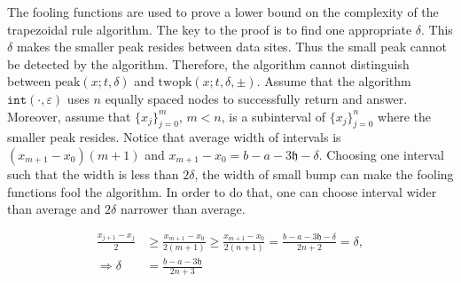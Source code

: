 \documentclass{iitthesis}
\theoremstyle{definition}
\theoremstyle{remark}
\begin{document}
The fooling functions are used to prove a lower bound on the complexity of the trapezoidal rule algorithm. The key to the proof is to find one appropriate $\delta$.  This $\delta$ makes the smaller peak resides between data sites. Thus the small peak cannot be detected by the algorithm. Therefore, the algorithm cannot distinguish between $\text{peak}(x;t,\delta)$ and $\text{twopk}(x;t,\delta,\pm)$. Assume that the algorithm $\texttt{int}(\cdot,\varepsilon)$ uses $n$ equally spaced nodes to successfully return and answer. Moreover, assume that $\{x_{j}\}_{j=0}^{m}$, $m<n$, is a subinterval of $\{x_{j}\}_{j=0}^{n}$ where the smaller peak resides. Notice that average width of intervals is $(x_{m+1}-x_{0})(m+1)$ and $x_{m+1}-x_{0}=b-a-3\mathfrak{h}-\delta$. Choosing one interval such that the width is less than $2\delta$, the width of small bump can make the fooling functions fool the algorithm. In order to do that, one can choose interval wider than average and $2\delta$ narrower than average.

  \begin{align*}
    \frac{x_{j+1}-x_{j}}{2}&\ge\frac{x_{m+1}-x_{0}}{2(m+1)}\ge\frac{x_{m+1}-x_{0}}{2(n+1)}=\frac{b-a-3\mathfrak{h}-\delta}{2n+2}=\delta,\\
    \Rightarrow \delta&=\frac{b-a-3\mathfrak{h}}{2n+3}
  \end{align*}
\end{document}
